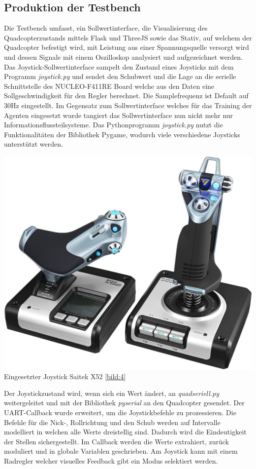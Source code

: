 \subsection{\label{testbench:testbench}Produktion der Testbench}
Die Testbench umfasst, ein Sollwertinterface, die Visualisierung des Quadcopterzustands mittels Flask und ThreeJS sowie das Stativ, auf welchem der Quadcopter befestigt wird, mit Leistung aus einer Spannungsquelle versorgt wird und dessen Signale mit einem Oszilloskop analysiert und aufgezeichnet werden. Das Joystick-Sollwertinterface sampelt den Zustand eines Joysticks mit dem Programm \textit{joystick.py} und sendet den Schubwert und die Lage an die serielle Schnittstelle des NUCLEO-F411RE Board welche aus den Daten eine Sollgeschwindigkeit für den Regler berechnet. Die Samplefrequenz ist Default auf 30Hz eingestellt. Im Gegensatz zum Sollwertinterface welches für das Training der Agenten eingesetzt wurde tangiert das Sollwertinterface nun nicht mehr nur Informationsflussteilsysteme.
Das Pythonprogramm \textit{joystick.py} nutzt die Funktionalitäten der Bibliothek Pygame, wodurch viele verschiedene Joysticks unterstützt werden.\\
\begin{center}
	\includegraphics[scale=0.125]{../images/0063 Joystick.jpg
	}{\\Eingesetzter Joystick Saitek X52 \ref{bild:4}}
\end{center}
Der Joystickzustand wird, wenn sich ein Wert ändert, an \textit{quadseriell.py} weitergeleitet und mit der Bibliothek \textit{pyserial} an den Quadcopter gesendet. Der UART-Callback wurde erweitert, um die Joystickbefehle zu prozessieren. Die Befehle für die Nick-, Rollrichtung und den Schub werden auf Intervalle modelliert in welchen alle Werte dreistellig sind. Dadurch wird die Eindeutigkeit der Stellen sichergestellt. Im Callback werden die Werte extrahiert, zurück moduliert und in globale Variablen geschrieben. Am Joystick kann mit einem Radregler welcher visuelles Feedback gibt ein Modus selektiert werden.

